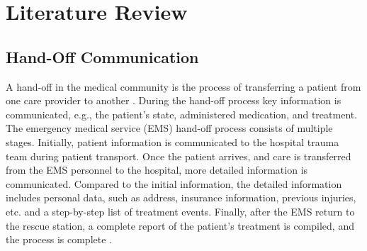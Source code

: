 
\chapter{Literature Review}
\label{ch:Literature-Review}

\section{Hand-Off Communication}
\label{sec:Literature-Review:Hand-Off-Communication}
A hand-off in the medical community is the process of transferring a patient from one care provider to another \cite{SoletDJNorvellJMRutanGH2005}. During the hand-off process key information is communicated, e.g., the patient’s state, administered medication, and treatment. The emergency medical service (\gls{EMS}) hand-off process consists of multiple stages. Initially, patient information is communicated to the hospital trauma team during patient transport. Once the patient arrives, and care is transferred from the EMS personnel to the hospital, more detailed information is communicated. Compared to the initial information, the detailed information includes personal data, such as address, insurance information, previous injuries, etc. and a step-by-step list of treatment events. Finally, after the EMS return to the rescue station, a complete report of the patient's treatment is compiled, and the process is complete \cite{Cohen2010}.
